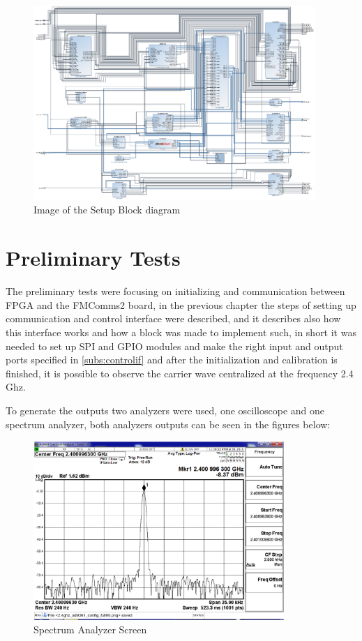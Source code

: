 \begin{figure}[htbp]
    \centering
    \includegraphics[width=0.95\textwidth]{./figures/setup_bd}
    \caption{ Image of the Setup Block diagram
    \label{fig:setupbd}}
\end{figure}

\vfill
\clearpage

\section{Preliminary Tests}
\label{result:conf}

The preliminary tests were focusing on initializing and communication between
FPGA and the FMComms2 board, in the previous chapter the steps of setting up
communication and control interface were described, and it describes also how
this interface works and how a block was made to implement such, in short it was
needed to set up SPI and GPIO modules and make the right input and output ports
specified in \ref{subs:controlif} and after the initialization and calibration
is finished, it is possible to observe the carrier wave centralized at the
frequency 2.4 Ghz.

To generate the outputs two analyzers were used, one oscilloscope and one
spectrum analyzer, both analyzers outputs can be seen in the figures below:

\begin{figure}[htbp]
    \centering
    \includegraphics[width=0.85\textwidth]{./figures/spectrum_init}
    \caption{ Spectrum Analyzer Screen
    \label{fig:spec}}
\end{figure}


